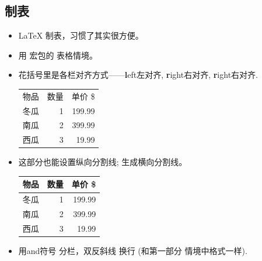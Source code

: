 \documentclass{beamer}
\begin{document}
\subsection{制表}
\begin{frame}[fragile]{\insertsubsection}
\begin{itemize}
\item \LaTeX{} 制表，习惯了其实很方便。
\item 用  宏包的 表格情境。 
\item 花括号里是各栏对齐方式——\textbf{l}eft左对齐, \textbf{r}ight右对齐, \textbf{r}ight右对齐.
\begin{exampletwouptiny}
\begin{tabular}{lrr}
物品   & 数量 & 单价 \$ \\
冬瓜   & 1   & 199.99  \\
南瓜   & 2   & 399.99  \\
西瓜   & 3   & 19.99   \\
\end{tabular}
\end{exampletwouptiny}
\item 这部分也能设置纵向分割线;  生成横向分割线。
\begin{exampletwouptiny}
\begin{tabular}{|l|r|r|} \hline
物品   & 数量 & 单价 \$ \\\hline
冬瓜   & 1   & 199.99  \\
南瓜   & 2   & 399.99  \\
西瓜   & 3   & 19.99   \\\hline
\end{tabular}
\end{exampletwouptiny}
\item 用and符号 \keystrokebftt{\&} 分栏，双反斜线 \keystrokebftt{\bs}\keystrokebftt{\bs} 换行 (和第一部分  情境中格式一样).
\end{itemize}
\end{frame}

\end{document}
